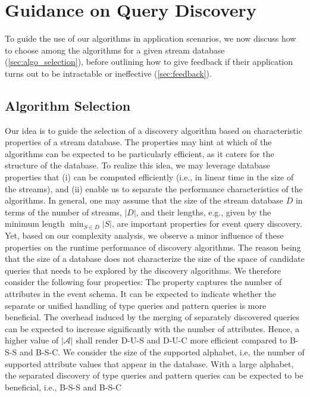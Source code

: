 \section{Guidance on Query Discovery}
\label{sec:instantiation}
To guide the use of our algorithms in application scenarios, we now discuss
how to choose among the algorithms for a
given stream database
(\autoref{sec:algo_selection}), before outlining how to give feedback if
their application turns out to be intractable or ineffective
(\autoref{sec:feedback}).
\subsection{Algorithm Selection}
\label{sec:algo_selection}
Our idea is to guide the selection of a discovery algorithm based on
characteristic properties of a stream database. The properties may hint at
which of the algorithms can be expected to be particularly
efficient, as it caters for the structure of the
database. To realize this idea, we may leverage database properties that
(i) can be computed efficiently (i.e., in linear time in
the size of the streams), and (ii) enable us to separate the
performance characteristics of the algorithms.
In general, one may assume that the size
of the stream database $D$ in terms of the number of streams, $|D|$, and
their lengths, e.g., given by the minimum length
$\min_{S\in D}|S|$, are important properties for event query discovery. Yet,
based on our complexity analysis, we observe a minor
influence of these properties on the runtime performance of discovery
algorithms. The reason being that the size of a database does not
characterize the size of the space of candidate queries that needs to be
explored by the discovery algorithms.
We therefore consider the following
four properties:
 The property captures the
number of attributes in the event schema.
It can be expected to indicate whether the separate or unified
handling of type queries and pattern queries is more beneficial. The
overhead induced by the merging of separately discovered queries can be
expected to increase significantly with the number of
attributes. Hence, a higher value of $|\mathcal{A}|$ shall render D-U-S
and D-U-C more efficient compared to B-S-S and B-S-C.
 We consider the
size of the supported alphabet, i.e, the number of supported
attribute values that appear in the database. With a large alphabet, the
separated discovery of type queries and
pattern queries can be expected to be beneficial, i.e., B-S-S and B-S-C

